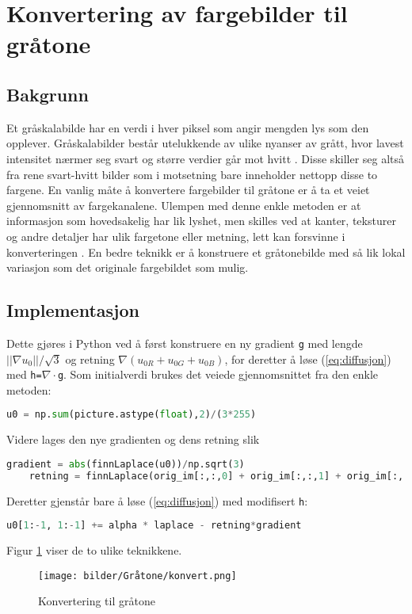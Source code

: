 \newpage
\section{Konvertering av fargebilder til gråtone}
\label{sec:gråtone}
\subsection{Bakgrunn}
Et gråskalabilde har en  verdi i hver piksel som angir mengden lys som den opplever. Gråskalabilder består utelukkende av ulike nyanser av grått, hvor lavest intensitet nærmer seg svart og større verdier går mot hvitt \cite{wiki:grayscale}. Disse skiller seg altså fra rene svart-hvitt bilder som i motsetning bare inneholder nettopp disse to fargene. En vanlig måte å konvertere fargebilder til gråtone er å ta et veiet gjennomsnitt av fargekanalene. Ulempen med denne enkle metoden er at informasjon som hovedsakelig har lik lyshet, men skilles ved at kanter, teksturer og andre detaljer har ulik fargetone eller metning, lett kan forsvinne i konverteringen \cite{prosjekt}.
\newline En bedre teknikk er å konstruere et gråtonebilde med så lik lokal variasjon som det originale fargebildet som mulig. 

\subsection{Implementasjon}
Dette gjøres i Python ved å først konstruere en ny gradient \texttt{g} med lengde $||\nabla u_0||/\sqrt{3}$ og retning $\nabla(u_{0R} + u_{0G} + u_{0B})$, for deretter å løse (\ref{eq:diffusjon}) med \texttt{h=$\nabla \cdot$g}.
\newline Som initialverdi brukes det veiede gjennomsnittet fra den enkle metoden:
\begin{lstlisting}[language=Python]
    u0 = np.sum(picture.astype(float),2)/(3*255)
\end{lstlisting}
Videre lages den nye gradienten og dens retning slik
\begin{lstlisting}[language=Python]
    gradient = abs(finnLaplace(u0))/np.sqrt(3)
    retning = finnLaplace(orig_im[:,:,0] + orig_im[:,:,1] + orig_im[:,:,2])
\end{lstlisting}
Deretter gjenstår bare å løse (\ref{eq:diffusjon}) med modifisert \texttt{h}:
\begin{lstlisting}[language=Python]
    u0[1:-1, 1:-1] += alpha * laplace - retning*gradient
\end{lstlisting}
Figur \ref{fig:graytone} viser de to ulike teknikkene.
\begin{figure}[H]
\begin{center}
    \texttt{[image: bilder/Gråtone/konvert.png]}
    \caption{Konvertering til gråtone
    \label{fig:graytone}} 
\end{center}
\end{figure}



